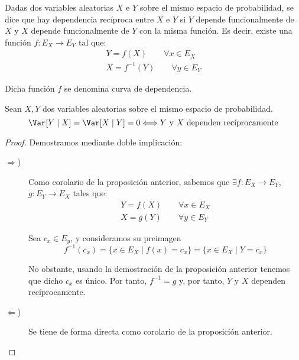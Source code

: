 \begin{definicion}
    Dadas dos variables aleatorias $X$ e $Y$ sobre el mismo espacio de probabilidad, se dice que hay dependencia recíproca entre $X$ e $Y$ si $Y$ depende funcionalmente de $X$ y $X$ depende funcionalmente de $Y$ con la misma función. Es decir, existe una función $f:E_X\to E_Y$ tal que:
    \begin{align*}
        Y = f(X) \qquad \forall x\in E_X\\
        X = f^{-1}(Y) \qquad \forall y\in E_Y
    \end{align*}

    Dicha función $f$ se denomina curva de dependencia.
\end{definicion}
\begin{coro}
    Sean $X,Y$ dos variables aleatorias sobre el mismo espacio de probabilidad.
    \begin{equation*}
        \Var[Y\mid X] = \Var[X\mid Y] = 0 \Longleftrightarrow Y \text{ y } X \text{ dependen recíprocamente}
    \end{equation*}
\end{coro}
\begin{proof}
    Demostramos mediante doble implicación:
    \begin{description}
        \item[$\Longrightarrow$)] Como corolario de la proposición anterior, sabemos que $\exists f:E_X\to E_Y$, $g:E_Y\to E_X$ tales que:
        \begin{align*}
            Y = f(X) \qquad \forall x\in E_X\\
            X = g(Y) \qquad \forall y\in E_Y
        \end{align*}

        Sea $c_x\in E_y$, y consideramos su preimagen
        $$f^{-1}(c_x) = \{x\in E_X\mid f(x) = c_x\}= \{x\in E_X\mid Y = c_x\}$$

        No obstante, usando la demostración de la proposición anterior tenemos que dicho $c_x$ es único. Por tanto, $f^{-1}=g$ y, por tanto, $Y$ y $X$ dependen recíprocamente.
        
        \item[$\Longleftarrow$)] Se tiene de forma directa como corolario de la proposición anterior.
    \end{description}
\end{proof}


